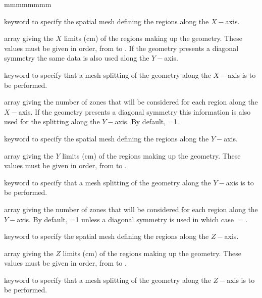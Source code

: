 \begin{ListeDeDescription}{mmmmmmmm}

\item[\moc{MESHX}] keyword to specify the spatial mesh defining the regions along the $X-$axis. 

\item[\dusa{xxx}] array giving the $X$ limits (cm) of the regions making up the geometry. These values
must be given in order, from  to . If the geometry presents a diagonal symmetry the same
data is also used along the $Y-$axis.

\item[\moc{SPLITX}] keyword to specify that a mesh splitting of the geometry along the $X-$axis is to be
performed.

\item[\dusa{ispltx}] array giving the number of zones that will be considered for each region along the
$X-$axis. If the geometry presents a diagonal symmetry this information is also used for the splitting
along the $Y-$axis. By default,
=1.

\item[\moc{MESHY}] keyword to specify the spatial mesh defining the regions along the $Y-$axis.

\item[\dusa{yyy}] array giving the $Y$ limits (cm) of the regions making up the geometry. These values
must be given in order, from  to .

\item[\moc{SPLITY}] keyword to specify that a mesh splitting of the geometry along the $Y-$axis is to be
performed.

\item[\dusa{isplty}] array giving the number of zones that will be considered for each region along the
$Y-$axis. By default,
=1 unless a diagonal symmetry is used in which case $=$.

\item[\moc{MESHZ}] keyword to specify the spatial mesh defining the regions along the $Z-$axis.

\item[\dusa{zzz}] array giving the $Z$ limits (cm) of the regions making up the geometry. These values
must be given in order, from   to .

\item[\moc{SPLITZ}] keyword to specify that a mesh splitting of the geometry along the $Z-$axis is to be
performed.


\end{ListeDeDescription}
